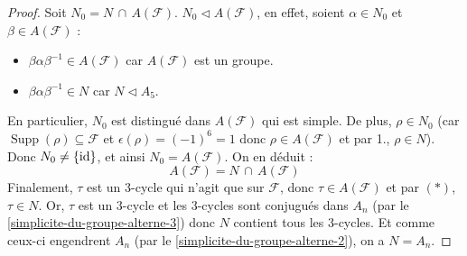 \begin{proof}
		\newpar
		Soit $N_0 = N \, \cap \, A(\mathcal{F})$. $N_0 \lhd A(\mathcal{F})$, en effet, soient $\alpha \in N_0$ et $\beta \in A(\mathcal{F})$ :
		\begin{itemize}
			\item $\beta \alpha \beta^{-1} \in A(\mathcal{F})$ car $A(\mathcal{F})$ est un groupe.
			\item $\beta \alpha \beta^{-1} \in N$ car $N \lhd A_5$.
		\end{itemize}
		En particulier, $N_0$ est distingué dans $A(\mathcal{F})$ qui est simple. De plus, $\rho \in N_0$ (car $\operatorname{Supp}(\rho) \subseteq \mathcal{F}$ et $\epsilon(\rho) = (-1)^{6} = 1$ donc $\rho \in A(\mathcal{F})$ et par 1., $\rho \in N$). Donc $N_0 \neq \{ \operatorname{id} \}$, et ainsi $N_0 = A(\mathcal{F})$. On en déduit :
		\[ A(\mathcal{F}) = N \, \cap \, A(\mathcal{F}) \tag{$*$} \]
		Finalement, $\tau$ est un $3$-cycle qui n'agit que sur $\mathcal{F}$, donc $\tau \in A(\mathcal{F})$ et par $(*)$, $\tau \in N$. Or, $\tau$ est un $3$-cycle et les $3$-cycles sont conjugués dans $A_n$ (par le \cref{simplicite-du-groupe-alterne-3}) donc $N$ contient tous les $3$-cycles. Et comme ceux-ci engendrent $A_n$ (par le \cref{simplicite-du-groupe-alterne-2}), on a $N = A_n$.
	\end{proof}

